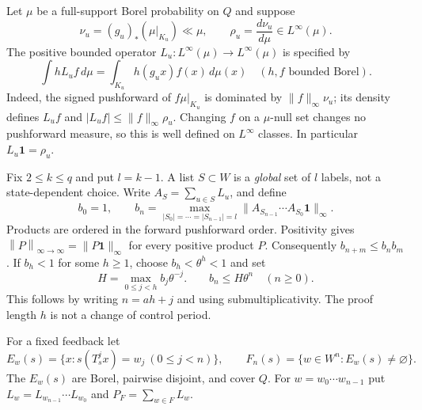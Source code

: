 \documentclass[11pt,reqno]{amsart}
\numberwithin{equation}{section}
\theoremstyle{definition}
\newcommand{\one}{\mathbf 1}
\newcommand{\opnorm}[1]{\left\|#1\right\|_{\infty\to\infty}}
\begin{document}
Let $\mu$ be a full-support Borel probability on $Q$ and suppose
\begin{equation}\label{eq:cap-density}
 \nu_u=(g_u)_*(\mu|_{K_u})\ll\mu,\qquad
 \rho_u=\frac{d\nu_u}{d\mu}\in L^\infty(\mu).
\end{equation}
The positive bounded operator $L_u:L^\infty(\mu)\to L^\infty(\mu)$
is specified by
\begin{equation}\label{eq:cap-transfer}
 \int hL_uf\,d\mu=\int_{K_u}h(g_ux)f(x)\,d\mu(x)
 \quad(h,f\text{ bounded Borel}).
\end{equation}
Indeed, the signed pushforward of $f\mu|_{K_u}$ is dominated by
$\|f\|_\infty\nu_u$; its density defines $L_uf$ and
$|L_uf|\le\|f\|_\infty\rho_u$. Changing $f$ on a $\mu$-null
set changes no pushforward measure, so this is well defined on
$L^\infty$ classes. In particular $L_u\one=\rho_u$.

Fix $2\le k\le q$ and put $l=k-1$. A list $S\subset W$ is a
\emph{global} set of $l$ labels, not a state-dependent choice.
Write $A_S=\sum_{u\in S}L_u$, and define
\begin{equation}\label{eq:cap-bn}
 b_0=1,\qquad
 b_n=\max_{|S_0|=\cdots=|S_{n-1}|=l}
 \|A_{S_{n-1}}\cdots A_{S_0}\one\|_\infty.
\end{equation}
Products are ordered in the forward pushforward order. Positivity gives
$\opnorm{P}=\|P\one\|_\infty$ for every positive product $P$.
Consequently $b_{n+m}\le b_nb_m$. If $b_h<1$ for some $h\ge1$,
choose $b_h<\theta^h<1$ and set
\begin{equation}\label{eq:cap-exp}
 H=\max_{0\le j<h}b_j\theta^{-j}.
 \qquad b_n\le H\theta^n\quad(n\ge0).
\end{equation}
This follows by writing $n=ah+j$ and using submultiplicativity.
The proof length $h$ is not a change of control period.

For a fixed feedback let
\[
 E_w(s)=\{x:s(T_s^jx)=w_j\ (0\le j<n)\},\qquad
 F_n(s)=\{w\in W^n:E_w(s)\ne\varnothing\}.
\]
The $E_w(s)$ are Borel, pairwise disjoint, and cover $Q$.
For $w=w_0\cdots w_{n-1}$ put
$L_w=L_{w_{n-1}}\cdots L_{w_0}$ and
$P_F=\sum_{w\in F}L_w$.
\end{document}
